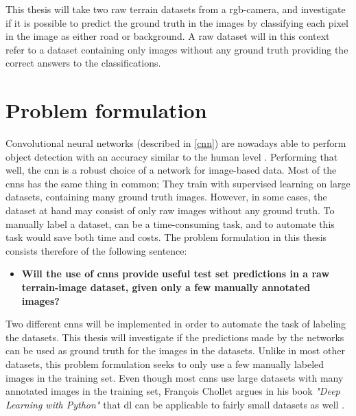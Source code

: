 \documentclass[USenglish]{ifimaster}  %
\begin{document}
This thesis will take two raw terrain datasets from a \ac{rgb}-camera, and investigate if it is possible to predict the ground truth in the images by classifying each pixel in the image as either road or background. A raw dataset will in this context refer to a dataset containing only images without any ground truth providing the correct answers to the classifications.

\section{Problem formulation}
Convolutional neural networks (described in \cref{cnn}) are nowadays able to perform object detection with an accuracy similar to the human level \cite{website:cnn}. Performing that well, the \ac{cnn} is a robust choice of a network for image-based data. Most of the \acp{cnn} has the same thing in common; They train with supervised learning on large datasets, containing many ground truth images. However, in some cases, the dataset at hand may consist of only raw images without any ground truth. To manually label a dataset, can be a time-consuming task, and to automate this task would save both time and costs. The problem formulation in this thesis consists therefore of the following sentence:
\begin{itemize}
\centering
  \item[] \textbf{Will the use of \acp{cnn} provide useful test set predictions in a raw terrain-image dataset, given only a few manually annotated images?} 
\end{itemize}

Two different \acp{cnn} will be implemented in order to automate the task of labeling the datasets. This thesis will investigate if the predictions made by the networks can be used as ground truth for the images in the datasets. Unlike in most other datasets, this problem formulation seeks to only use a few manually labeled images in the training set. Even though most \acp{cnn} use large datasets with many annotated images in the training set, François Chollet argues in his book \textit{"Deep Learning with Python"} that \ac{dl} can be applicable to fairly small datasets as well \cite{Francois_Deep_learning_with_python}. 
\end{document}
